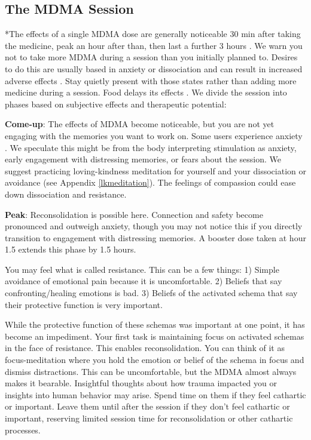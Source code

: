 \documentclass[12pt,letterpaper]{article}
\begin{document}
\subsection{The MDMA Session}
\label{session}
*The effects of a single MDMA dose are generally noticeable 30 min after taking the medicine, peak an hour after than, then last a further 3 hours \cite{vizeliActuteEffects}. We warn you not to take more MDMA during a session than you initially planned to. Desires to do this are usually based in anxiety or dissociation and can result in increased adverse effects \cite{bruntLinking}. Stay quietly present with those states rather than adding more medicine during a session. Food delays its effects \cite{MithoeferMDMA}. We divide the session into phases based on subjective effects and therapeutic potential:

\textbf{Come-up}:
The effects of MDMA become noticeable, but you are not yet engaging with the memories you want to work on. Some users experience anxiety \cite{hillsSolo}. We speculate this might be from the body interpreting stimulation as anxiety, early engagement with distressing memories, or fears about the session. We suggest practicing loving-kindness meditation for yourself and your dissociation or avoidance (see Appendix \ref{lkmeditation}). The feelings of compassion could ease down dissociation and resistance.

\textbf{Peak}:
Reconsolidation is possible here. Connection and safety become pronounced and outweigh anxiety, though you may not notice this if you directly transition to engagement with distressing memories. A booster dose taken at hour 1.5 extends this phase by 1.5 hours.

You may feel what is called resistance. This can be a few things: 1) Simple avoidance of emotional pain because it is uncomfortable. 2) Beliefs that say confronting/healing emotions is bad. 3) Beliefs of the activated schema that say their protective function is very important. 

While the protective function of these schemas was important at one point, it has become an impediment. Your first task is maintaining focus on activated schemas in the face of resistance. This enables reconsolidation. You can think of it as focus-meditation where you hold the emotion or belief of the schema in focus and dismiss distractions. This can be uncomfortable, but the MDMA almost always makes it bearable. Insightful thoughts about how trauma impacted you or insights into human behavior may arise. Spend time on them if they feel cathartic or important. Leave them until after the session if they don't feel cathartic or important, reserving limited session time for reconsolidation or other cathartic processes. 
\end{document}
